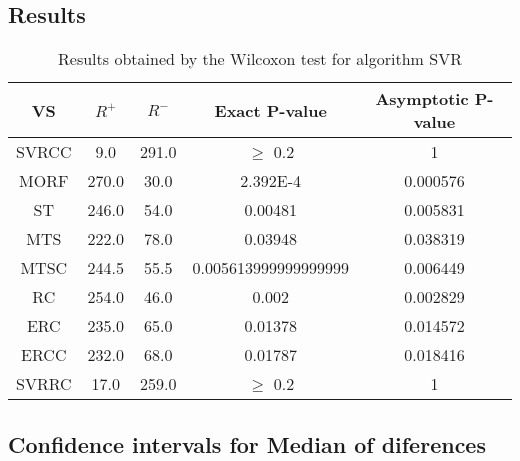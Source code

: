 \documentclass[a4paper,10pt]{article}
\begin{document}
\subsection{Results}

\begin{table}[!htp]
\centering\small
\begin{tabular}{
|c|c|c|c|c|}
\hline
 VS & $R^{+}$ & $R^{-}$ & Exact P-value & Asymptotic P-value \\ \hline 
SVRCC & 9.0 & 291.0 & $\geq$ 0.2 & 1\\ \hline 
MORF & 270.0 & 30.0 & 2.392E-4 & 0.000576\\ \hline 
ST & 246.0 & 54.0 & 0.00481 & 0.005831\\ \hline 
MTS & 222.0 & 78.0 & 0.03948 & 0.038319\\ \hline 
MTSC & 244.5 & 55.5 & 0.005613999999999999 & 0.006449\\ \hline 
RC & 254.0 & 46.0 & 0.002 & 0.002829\\ \hline 
ERC & 235.0 & 65.0 & 0.01378 & 0.014572\\ \hline 
ERCC & 232.0 & 68.0 & 0.01787 & 0.018416\\ \hline 
SVRRC & 17.0 & 259.0 & $\geq$ 0.2 & 1\\ \hline 

\end{tabular}
\caption{Results obtained by the Wilcoxon test for algorithm SVR}
\end{table}

\subsection{Confidence intervals for Median of diferences}
\end{document}
